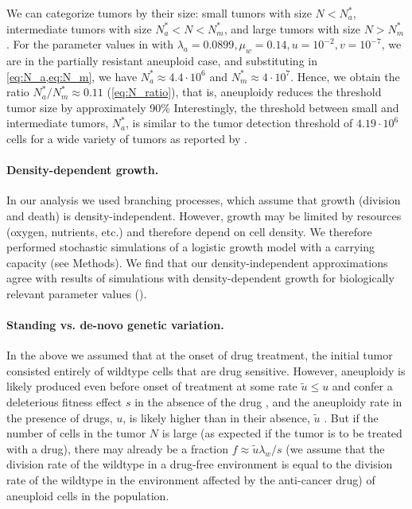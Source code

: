 \documentclass[12pt]{extarticle}
\begin{document}
We can categorize tumors by their size: small tumors with size $N<N_a^*$, intermediate tumors with size $N_a^*<N<N_m^*$, and large tumors with size $N>N_m^*$ .
For the parameter values in  with $\lambda_a=0.0899,\mu_w=0.14, u=10^{-2}, v=10^{-7}$, we are in the partially resistant aneuploid case, and substituting in \cref{eq:N_a,eq:N_m}, we have $N_a^* \approx 4.4 \cdot 10^6$ and $N_m^* \approx 4 \cdot 10^7$.
Hence, we obtain the ratio $N^*_a/N^*_m \approx 0.11$ (\cref{eq:N_ratio}), that is, aneuploidy reduces the threshold tumor size by approximately 90\% 
Interestingly, the threshold between small and intermediate tumors, $N_a^*$, is similar to the tumor detection threshold of $4.19 \cdot 10^6$ cells for a wide variety of tumors as reported by \citet{avanzini2019cancer}.

\paragraph*{Density-dependent growth.}

In our analysis we used branching processes, which assume that growth (division and death) is density-independent. However, growth may be limited by resources (oxygen, nutrients, etc.) and therefore depend on cell density. 
We therefore performed stochastic simulations of a logistic growth model with a carrying capacity (see Methods). 
We find that our density-independent approximations agree with results of simulations with density-dependent growth for biologically relevant parameter values ().

\paragraph*{Standing vs. de-novo genetic variation.}

In the above we assumed that at the onset of drug treatment, the initial tumor consisted entirely of wildtype cells that are drug sensitive.
However, aneuploidy is likely produced even before onset of treatment at some rate $\tilde{u} \le u$ and confer a deleterious fitness effect $s$ in the absence of the drug \citep{replogle2020aneuploidy,giam2015aneuploidy}, and the aneuploidy rate in the presence of drugs, $u$, is likely higher than in their absence, $\tilde{u}$ \citep{wang2019molecular,mason2017functional}.
But if the number of cells in the tumor $N$ is large (as expected if the tumor is to be treated with a drug), there may already be a fraction $f \approx \tilde{u}\lambda_w/s$ (we assume that the division rate of the wildtype in a drug-free environment is equal to the division rate of the wildtype in the environment affected by the anti-cancer drug) of aneuploid cells in the population.
\end{document}
